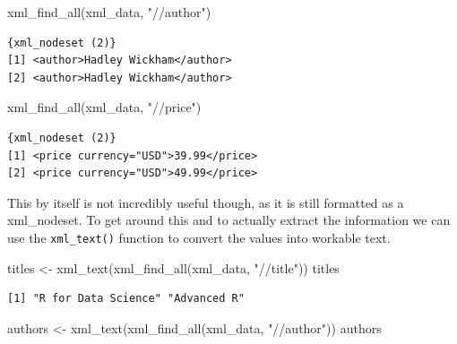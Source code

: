 \documentclass[
  letterpaper,
  DIV=11,
  numbers=noendperiod]{scrreprt}
\newenvironment{Shaded}{\begin{snugshade}}{\end{snugshade}}
\newcommand{\FunctionTok}[1]{\textcolor[rgb]{0.28,0.35,0.67}{#1}}
\newcommand{\NormalTok}[1]{\textcolor[rgb]{0.00,0.23,0.31}{#1}}
\newcommand{\OtherTok}[1]{\textcolor[rgb]{0.00,0.23,0.31}{#1}}
\newcommand{\StringTok}[1]{\textcolor[rgb]{0.13,0.47,0.30}{#1}}
\begin{document}
\begin{Shaded}
\begin{Highlighting}[]
\FunctionTok{xml\_find\_all}\NormalTok{(xml\_data, }\StringTok{"//author"}\NormalTok{)}
\end{Highlighting}
\end{Shaded}

\begin{verbatim}
{xml_nodeset (2)}
[1] <author>Hadley Wickham</author>
[2] <author>Hadley Wickham</author>
\end{verbatim}

\begin{Shaded}
\begin{Highlighting}[]
\FunctionTok{xml\_find\_all}\NormalTok{(xml\_data, }\StringTok{"//price"}\NormalTok{)}
\end{Highlighting}
\end{Shaded}

\begin{verbatim}
{xml_nodeset (2)}
[1] <price currency="USD">39.99</price>
[2] <price currency="USD">49.99</price>
\end{verbatim}

This by itself is not incredibly useful though, as it is still formatted
as a xml\_nodeset. To get around this and to actually extract the
information we can use the \texttt{xml\_text()} function to convert the
values into workable text.

\begin{Shaded}
\begin{Highlighting}[]
\NormalTok{titles }\OtherTok{\textless{}{-}} \FunctionTok{xml\_text}\NormalTok{(}\FunctionTok{xml\_find\_all}\NormalTok{(xml\_data, }\StringTok{"//title"}\NormalTok{))}
\NormalTok{titles}
\end{Highlighting}
\end{Shaded}

\begin{verbatim}
[1] "R for Data Science" "Advanced R"        
\end{verbatim}

\begin{Shaded}
\begin{Highlighting}[]
\NormalTok{authors }\OtherTok{\textless{}{-}} \FunctionTok{xml\_text}\NormalTok{(}\FunctionTok{xml\_find\_all}\NormalTok{(xml\_data, }\StringTok{"//author"}\NormalTok{))}
\NormalTok{authors}
\end{Highlighting}
\end{Shaded}
\end{document}

